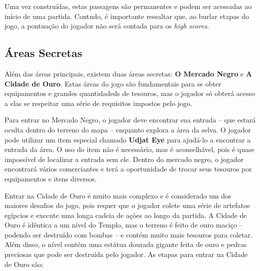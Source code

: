 Uma vez construídas, estas passagens são permanentes e podem ser acessadas ao
início de uma partida. Contudo, é importante ressaltar que, ao burlar etapas do
jogo, a pontuação do jogador não será contada para os \textit{high scores}.


\subsection{Áreas Secretas}
Além das áreas principais, existem duas áreas secretas: \textbf{O Mercado Negro}
e \textbf{A Cidade de Ouro}. Estas áreas do jogo são fundamentais para se obter
equipamentos e grandes quantidadeds de tesouros, mas o jogador só obterá acesso
a elas se respeitar uma série de requisitos impostos pelo jogo.

Para entrar no Mercado Negro, o jogador deve encontrar sua entrada -- que estará
oculta dentro do terreno do mapa -- enquanto explora a área da selva. O jogador
pode utilizar um item especial chamado \textbf{Udjat Eye} para ajudá-lo a
encontrar a entrada da área. O uso do item não é necessário, mas é aconselhável,
pois é quase impossível de localizar a entrada sem ele. Dentro do mercado negro,
o jogador encontrará vários comerciantes e terá a oportunidade de trocar seus
tesouros por equipamentos e itens diversos.

Entrar na Cidade de Ouro é muito mais complexo e é considerado um dos maiores
desafios do jogo, pois requer que o jogador colete uma série de artefatos
egípcios e execute uma longa cadeia de ações ao longo da partida. A Cidade de
Ouro é idêntica a um nível do Templo, mas o terreno é feito de ouro maciço --
podendo ser destruído com bombas -- e contém muito mais tesouros para coletar.
Além disso, o nível contém uma estátua dourada gigante feita de ouro e pedras
preciosas que pode ser destruída pelo jogador. As etapas para entrar na Cidade
de Ouro são:

